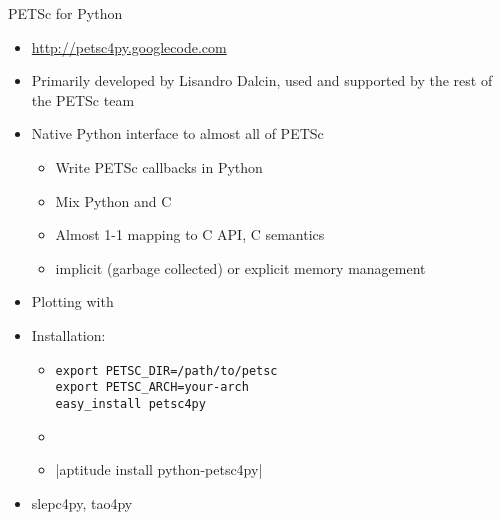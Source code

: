 \begin{frame}[fragile]{PETSc for Python}
  \begin{itemize}
  \item \url{http://petsc4py.googlecode.com}
  \item Primarily developed by Lisandro Dalcin, used and supported by the rest of the PETSc team
  \item Native Python interface to almost all of PETSc
    \begin{itemize}
    \item Write PETSc callbacks in Python
    \item Mix Python and C
    \item Almost 1-1 mapping to C API, C semantics
    \item implicit (garbage collected) or explicit memory management
    \end{itemize}
  \item Plotting with 
  \item Installation:
    \begin{itemize}
    \item \begin{verbatim}
export PETSC_DIR=/path/to/petsc
export PETSC_ARCH=your-arch
easy_install petsc4py
      \end{verbatim}
    \item {}
    \item {}|aptitude install python-petsc4py|
    \end{itemize}
  \item slepc4py, tao4py
  \end{itemize}
\end{frame}
